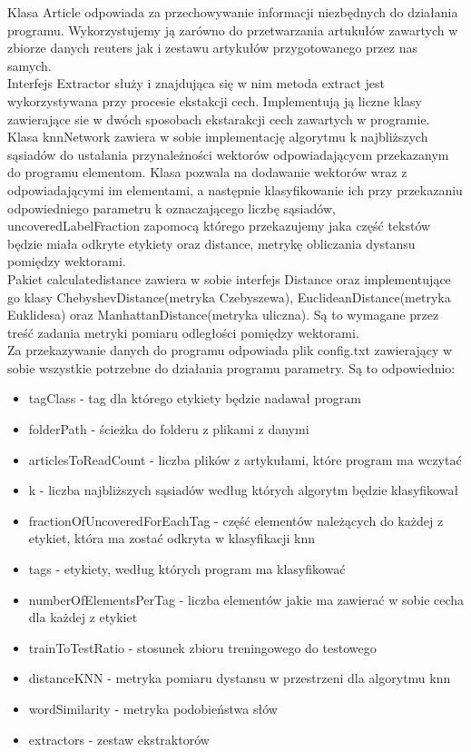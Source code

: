 \documentclass{classrep}
\begin{document}
Klasa Article odpowiada za przechowywanie informacji niezbędnych do działania programu. Wykorzystujemy ją zarówno do przetwarzania artukułów zawartych w zbiorze danych reuters jak i zestawu artykułów przygotowanego przez nas samych.\\
Interfejs Extractor służy i znajdująca się w nim metoda extract jest wykorzystywana przy procesie ekstakcji cech. Implementują ją liczne klasy zawierające sie w dwóch sposobach ekstarakcji cech zawartych w programie.\\
Klasa knnNetwork zawiera w sobie implementację algorytmu k najbliższych sąsiadów do ustalania przynależności wektorów odpowiadającycm przekazanym do programu elementom. Klasa pozwala na dodawanie wektorów wraz z odpowiadającymi im elementami, a następnie klasyfikowanie ich przy przekazaniu odpowiedniego parametru k oznaczającego liczbę sąsiadów, uncoveredLabelFraction zapomocą którego przekazujemy jaka część tekstów będzie miała odkryte etykiety oraz distance, metrykę obliczania dystansu pomiędzy wektorami.\\
Pakiet calculatedistance zawiera w sobie interfejs Distance oraz implementujące go klasy ChebyshevDistance(metryka Czebyszewa), EuclideanDistance(metryka Euklidesa) oraz ManhattanDistance(metryka uliczna). Są to wymagane przez treść zadania metryki pomiaru odległości pomiędzy wektorami.\\
Za przekazywanie danych do programu odpowiada plik config.txt zawierający w sobie wszystkie potrzebne do działania programu parametry. Są to odpowiednio:
\begin{itemize}
	\item tagClass - tag dla którego etykiety będzie nadawał program
	\item folderPath - ścieżka do folderu z plikami z danymi
	\item articlesToReadCount - liczba plików z artykułami, które program ma wczytać
	\item k - liczba najbliższych sąsiadów według których algorytm będzie klasyfikował
	\item fractionOfUncoveredForEachTag - część elementów należących do każdej z etykiet, która ma zostać odkryta w klasyfikacji knn
	\item tags - etykiety, według których program ma klasyfikować
	\item numberOfElementsPerTag - liczba elementów jakie ma zawierać w sobie cecha dla każdej z etykiet
	\item trainToTestRatio - stosunek zbioru treningowego do testowego
	\item distanceKNN - metryka pomiaru dystansu w przestrzeni dla algorytmu knn
	\item wordSimilarity - metryka podobieństwa słów
	\item extractors - zestaw ekstraktorów
\end{itemize}
\newpage
\end{document}
